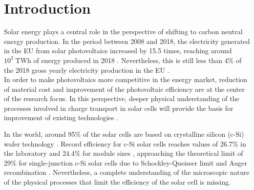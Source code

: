 \documentclass[a4paper]{book}
\begin{document}
	\chapter{Introduction}
	Solar energy plays a central role in the perspective of shifting to carbon neutral energy production. In the period between 2008 and 2018, the electricity generated in the EU from solar photovoltaics increased by 15.5 times, reaching around $10^3 \; \text{TWh}$ of energy produced in 2018 \cite{ahmadRecentAdvancesApplications2020}. Nevertheless, this is still less than 4\% of the 2018 gross yearly electricity production in the EU \cite{statisticalofficeoftheeuropeanunionEnergyBalanceSheets2020}.\\
	In order to make photovoltaics more competitive in the energy market, reduction of material cost and improvement of the photovoltaic efficiency are at the center of the research focus. In this perspective, deeper physical understanding of the processes involved in charge transport in solar cells will provide the basis for improvement of existing technologies \cite{schneggPulsedElectricallyDetected2012}\cite{behrendsSpindependentTransportRecombination2009}.\par
	
	In the world, around 95\% of the solar cells are based on crystalline silicon (c-Si) wafer technology \cite{InternationalTechnologyRoadmap2021}. Record efficiency for c-Si solar cells reaches values of 26.7\% in the laboratory and 24.4\% for module sizes \cite{greenSolarCellEfficiency2021}, approaching the theoretical limit of 29\% for single-junction c-Si solar cells due to Schockley-Queisser limit and Auger recombination \cite{richterReassessmentLimitingEfficiency2013}. Nevertheless, a complete understanding of the microscopic nature of the physical processes that limit the efficiency of the solar cell is missing.\par
	
\end{document}
